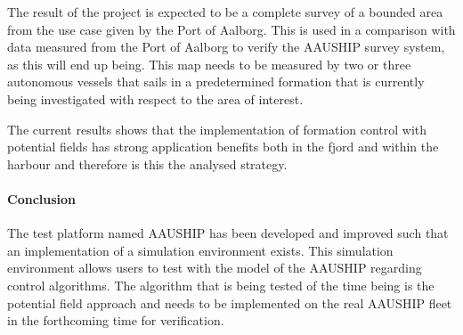 \documentclass[a4paper,12pt]{article}
\begin{document}
The result of the project is expected to be a complete survey of a
bounded area from the use case given by the Port of Aalborg. This is
used in a comparison with data measured from the Port of Aalborg to
verify the AAUSHIP survey system, as this will end up being. This map
needs to be measured by two or three autonomous vessels that sails in
a predetermined formation that is currently being investigated with
respect to the area of interest.

The current results shows that the implementation of formation control
with potential fields has strong application benefits both in the
fjord and within the harbour and therefore is this the analysed
strategy.


\paragraph{Conclusion}

The test platform named AAUSHIP has been developed and improved
such that an implementation of a simulation environment exists.
This simulation environment allows users to test with the model
of the AAUSHIP regarding control algorithms. The algorithm that is
being tested of the time being is the potential field approach and needs
to be implemented on the real AAUSHIP fleet in the forthcoming time for
verification.
 
\end{document}
